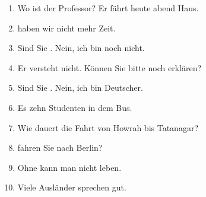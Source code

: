 \documentclass[12pt]{article}
\begin{document}
\begin{enumerate}
\item Wo ist der Professor? Er fährt heute abend \underline{\hspace{2cm}} Haus.
\item \underline{\hspace{2cm}} haben wir nicht mehr Zeit.
\item Sind Sie \underline{\hspace{2cm}}. Nein, ich bin noch nicht.
\item Er versteht nicht. Können Sie bitte noch \underline{\hspace{2cm}} erklären?
\item Sind Sie \underline{\hspace{2cm}}. Nein, ich bin Deutscher.
\item Es \underline{\hspace{2cm}} zehn Studenten in dem Bus.
\item Wie \underline{\hspace{2cm}} dauert die Fahrt von Howrah bis Tatanagar?
\item \underline{\hspace{2cm}} fahren Sie nach Berlin?
\item Ohne \underline{\hspace{2cm}} kann man nicht leben.
\item Viele Ausländer sprechen \underline{\hspace{2cm}} gut.
\end{enumerate}
\end{document}
